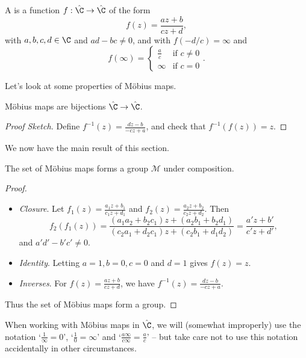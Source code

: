 \documentclass[a4]{scrreprt}
\begin{document}
\begin{definition}
	A  is a function $f : \hat{\C} \rightarrow \hat{\C}$ of the form
	$$
	f(z) = \frac{az + b}{cz + d},
	$$
	with $a, b, c, d \in \C$ and $ad - bc \neq 0$, and with $f(-d/c) = \infty$ and 
	$$
	f(\infty) = \begin{cases}
	   \frac{a}{c} &\mbox{if } c \neq 0 \\
	   \infty &\mbox{if } c = 0
	   \end{cases}.
	$$
\end{definition}

Let's look at some properties of Möbius maps.

\begin{proposition}
	Möbius maps are bijections $\hat{\C} \rightarrow \hat{\C}$.
\end{proposition}
\begin{proof}[Proof Sketch]
	Define $f^{-1}(z) = \frac{dz - b}{-cz + a}$, and check that $f^{-1}(f(z)) = z$.
\end{proof}

We now have the main result of this section.

\begin{theorem}
	The set of Möbius maps forms a group $\mathcal{M}$ under composition.
\end{theorem}
\begin{proof}$ $
	\begin{itemize}
		\item \emph{Closure}. Let $f_1(z) = \frac{a_1 z + b_1}{c_1 z + d_1}$ and $f_2(z) = \frac{a_2 z + b_2}{c_2 z + d_2}$. Then
		$$
		f_2(f_1(z)) = \frac{(a_1 a_2 + b_2 c_1)z + (a_2 b_1 + b_2 d_1)}{(c_2 a_1 + d_2 c_1)z + (c_2 b_1+ d_1 d_2)} = \frac{a' z + b'}{c' z + d'},
		$$
		and $a' d' - b' c' \neq 0$.
		\item \emph{Identity}. Letting $a = 1, b = 0, c = 0$ and $d = 1$ gives $f(z) = z$.
		\item \emph{Inverses}. For $f(z) = \frac{az + b}{cz + d}$, we have $f^{-1}(z) = \frac{dz - b}{-cz + a}$. 
	\end{itemize}
	Thus the set of Möbius maps form a group.
\end{proof}

\begin{remark}
	When working with Möbius maps in $\hat{\C}$, we will (somewhat improperly) use the notation `$\frac{1}{\infty} = 0$', `$\frac{1}{0} = \infty$' and `$\frac{a\infty}{c \infty} = \frac{a}{c}$' -- but take care not to use this notation accidentally in other circumstances.
\end{remark}
\end{document}
